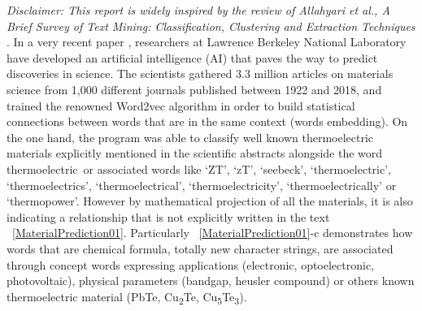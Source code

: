 \label{chap_intro}

\textit{Disclaimer: This report is widely inspired by the review of Allahyari et al., A Brief Survey of Text Mining: Classification, Clustering and Extraction Techniques} \citep{Allahyari2017}.
\newline
\newline
In a very recent paper \citep{Tshitoyan2019}, researchers at Lawrence Berkeley National Laboratory have developed an artificial intelligence (AI) that paves the way to predict discoveries in science.
The scientists gathered 3.3 million articles on materials science from 1,000 different journals published between 1922 and 2018, and trained the renowned Word2vec algorithm in order to build statistical connections between words that are in the same context (\cf words embedding). 
\newline
On the one hand, the program was able to classify well known thermoelectric materials explicitly mentioned in the scientific abstracts alongside the word \doq thermoelectric\deq~or associated words like ‘ZT’, ‘zT’, ‘seebeck’, ‘thermoelectric’, ‘thermoelectrics’, ‘thermoelectrical’, ‘thermoelectricity’, ‘thermoelectrically’ or ‘thermopower’. However by mathematical projection of all the materials, it is also indicating a relationship that is not explicitly written in the text \fig~\ref{MaterialPrediction01}. Particularly \fig~\ref{MaterialPrediction01}-c demonstrates how words that are chemical formula, \ie totally new character strings, are associated through concept words expressing applications (electronic, optoelectronic, photovoltaic), physical parameters (bandgap, heusler compound) or others known thermoelectric material (PbTe, Cu\textsubscript{2}Te, Cu\textsubscript{5}Te\textsubscript{3}). 
